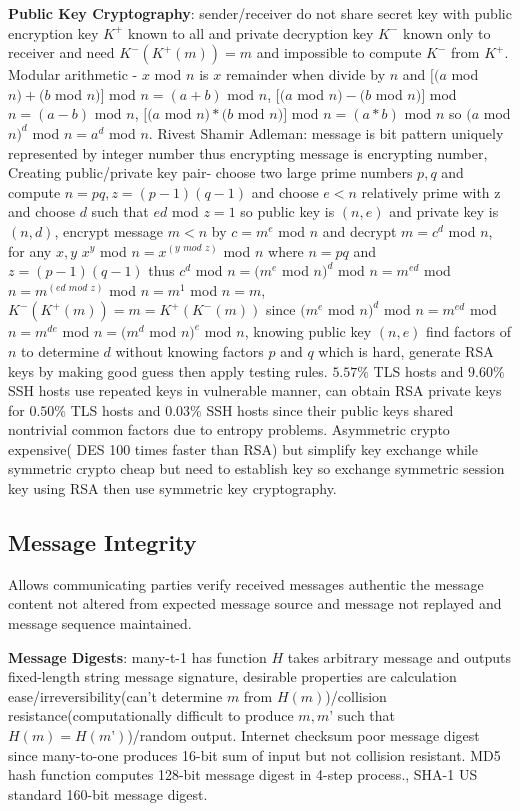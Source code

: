 \documentclass[9pt]{extarticle}
\begin{document}
\begin{multicols}{2}
\textbf{Public Key Cryptography}: sender/receiver do not share secret key with public encryption key $K^+$ known to all and private decryption key $K^-$ known only to receiver and need $K^-(K^+(m))=m$ and impossible to compute $K^-$ from $K^+$. Modular arithmetic - $x$ mod $n$ is $x$ remainder when divide by $n$ and $[(a$ mod $n)+(b$ mod $n)]$ mod $n=(a+b)$ mod $n$, $[(a$ mod $n)-(b$ mod $n)]$ mod $n=(a-b)$ mod $n$, $[(a$ mod $n)*(b$ mod $n)]$ mod $n=(a*b)$ mod $n$ so $(a$ mod $n)^d$ mod $n=a^d$ mod $n$. Rivest Shamir Adleman: message is bit pattern uniquely represented by integer number thus encrypting message is encrypting number,  Creating public/private key pair- choose two large prime numbers $p,q$ and compute $n=pq,z =(p-1)(q-1)$ and choose $e<n$ relatively prime with z and choose $d$ such that $ed$ mod $z=1$ so public key is $(n,e)$ and  private key is $(n,d)$, encrypt message $m<n$ by $c=m^e$ mod $n$ and decrypt $m=c^d$ mod $n$, for any $x,y$ $x^y$ mod $n =x^{(y\textit{ mod }z)}$ mod $n$ where $n=pq$ and $z=(p-1)(q-1)$ thus $c^d$ mod $n=(m^e$ mod $n)^d$ mod $n=m^{ed}$ mod $n=m^{(ed\textit{ mod }z)}$ mod $n=m^1$ mod $n=m$, $K^-(K^+(m))=m=K^+(K^-(m))$ since $(m^e$ mod $n)^d$ mod $n=m^{ed}$ mod $n=m^{de}$ mod $n=(m^d$ mod $n)^e$ mod $n$, knowing public key $(n,e)$ find factors of $n$ to determine $d$ without knowing factors $p$ and $q$ which is hard, generate RSA keys by making good guess then apply testing rules. $5.57\%$ TLS hosts and $9.60\%$ SSH hosts use repeated keys in vulnerable manner, can obtain RSA private keys for $0.50\%$ TLS hosts and $0.03\%$ SSH hosts since their public keys shared nontrivial
common factors due to entropy problems. Asymmetric crypto expensive( DES 100 times faster than RSA) but simplify key exchange while symmetric crypto cheap but need to establish key so exchange symmetric session key using RSA then use symmetric key cryptography. 

\subsection{Message Integrity}

Allows communicating parties verify received messages authentic the message content not altered from expected message source and message not replayed and message sequence maintained.

\textbf{Message Digests}: many-t-1 has function $H$ takes arbitrary message and outputs fixed-length string message signature, desirable properties are calculation ease/irreversibility(can’t determine $m$ from $H(m)$)/collision resistance(computationally difficult to produce $m,m’$ such that $H(m)=H(m’)$)/random output. Internet checksum poor message digest since many-to-one produces 16-bit sum of input but not collision resistant. MD5 hash function computes 128-bit message digest in 4-step process., SHA-1 US standard 160-bit message digest. 


\end{multicols}
\end{document}
